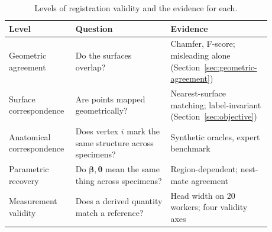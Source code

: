 \begin{table}[!htb]
\centering
\caption{Levels of registration validity and the evidence for each.}
\label{tab:validity}
\begin{tabular}{@{}L{0.20\linewidth}L{0.34\linewidth}L{0.34\linewidth}@{}}
\toprule
\textbf{Level} & \textbf{Question} & \textbf{Evidence}\\
\midrule
Geometric agreement & Do the surfaces overlap? & Chamfer, F-score; misleading alone
 (Section~\ref{sec:geometric-agreement})\\
Surface correspondence & Are points mapped geometrically? & Nearest-surface matching;
 label-invariant (Section~\ref{sec:objective})\\
Anatomical correspondence & Does vertex $i$ mark the same structure across specimens? &
 Synthetic oracles, expert benchmark\\
Parametric recovery & Do $\bm\beta,\bm\theta$ mean the same thing across specimens? &
 Region-dependent; nest-mate agreement\\
Measurement validity & Does a derived quantity match a reference? & Head width on 20
 workers; four validity axes\\
\bottomrule
\end{tabular}
\end{table}
